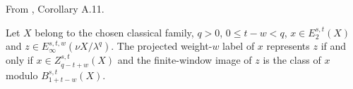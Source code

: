 \begin{theorem}
\label{frontier:Literature:dd88947b5ffc}
From \cite{BHS}, Corollary A.11.\par

Let $X$ belong to the chosen classical family, $q>0$, $0\le t-w<q$, $x\in E_2^{s,t}(X)$ and $z\in E_\infty^{s,t,w}(\nu X/\lambda^q)$. The projected weight-$w$ label of $x$ represents $z$ if and only if $x\in Z_{q-t+w}^{s,t}(X)$ and the finite-window image of $z$ is the class of $x$ modulo $B_{1+t-w}^{s,t}(X)$.
\end{theorem}

